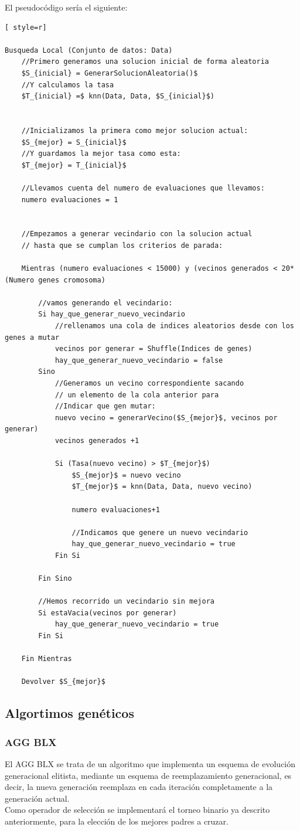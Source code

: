 El pseudocódigo sería el siguiente:

\begin{lstlisting}[ style=r]

Busqueda Local (Conjunto de datos: Data)
	//Primero generamos una solucion inicial de forma aleatoria
	$S_{inicial} = GenerarSolucionAleatoria()$
	//Y calculamos la tasa
	$T_{inicial} =$ knn(Data, Data, $S_{inicial}$)
	
	
	//Inicializamos la primera como mejor solucion actual:
	$S_{mejor} = S_{inicial}$
	//Y guardamos la mejor tasa como esta:
	$T_{mejor} = T_{inicial}$
	
	//Llevamos cuenta del numero de evaluaciones que llevamos:
	numero evaluaciones = 1
	
	
	//Empezamos a generar vecindario con la solucion actual 
	// hasta que se cumplan los criterios de parada:

	Mientras (numero evaluaciones < 15000) y (vecinos generados < 20*(Numero genes cromosoma)
	
		//vamos generando el vecindario:
		Si hay_que_generar_nuevo_vecindario
			//rellenamos una cola de indices aleatorios desde con los genes a mutar
			vecinos por generar = Shuffle(Indices de genes)
			hay_que_generar_nuevo_vecindario = false
		Sino
			//Generamos un vecino correspondiente sacando
			// un elemento de la cola anterior para
			//Indicar que gen mutar:
			nuevo vecino = generarVecino($S_{mejor}$, vecinos por generar)
			vecinos generados +1
			
			Si (Tasa(nuevo vecino) > $T_{mejor}$)
				$S_{mejor}$ = nuevo vecino
				$T_{mejor}$ = knn(Data, Data, nuevo vecino)
				
				numero evaluaciones+1
				
				//Indicamos que genere un nuevo vecindario
				hay_que_generar_nuevo_vecindario = true
			Fin Si
			
		Fin Sino
		
		//Hemos recorrido un vecindario sin mejora
		Si estaVacia(vecinos por generar)
			hay_que_generar_nuevo_vecindario = true
		Fin Si
		
	Fin Mientras
	
	Devolver $S_{mejor}$
\end{lstlisting}


\subsection{Algortimos genéticos}

\subsubsection{AGG BLX}
El AGG BLX se trata de un algoritmo que implementa un esquema de evolución generacional elitista, mediante un esquema de reemplazamiento generacional, es decir, la nueva generación reemplaza en cada iteración completamente a la generación actual.\\ 
Como operador de selección se implementará el torneo binario ya descrito anteriormente, para la elección de los mejores padres a cruzar.\\ 

